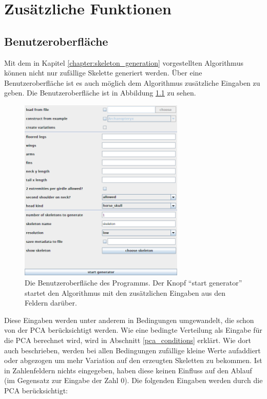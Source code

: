 \chapter{Zusätzliche Funktionen}
\label{chapter:additional_features}


\section{Benutzeroberfläche}
\label{gui}

Mit dem in Kapitel \ref{chapter:skeleton_generation} vorgestellten Algorithmus können nicht nur zufällige Skelette generiert werden. Über eine Benutzeroberfläche ist es auch möglich dem Algorithmus zusätzliche Eingaben zu geben. Die Benutzeroberfläche ist in Abbildung \ref{gui_screenshot} zu sehen.

\begin{figure}
 \centering
 \includegraphics[width=0.7\textwidth]{graphics/gui.png}
 \caption{Die Benutzeroberfläche des Programms. Der Knopf "`start generator"' startet den Algorithmus mit den zusätzlichen Eingaben aus den Feldern darüber.}
 \label{gui_screenshot}
\end{figure}

Diese Eingaben werden unter anderem in Bedingungen umgewandelt, die schon von der PCA berücksichtigt werden. Wie eine bedingte Verteilung als Eingabe für die PCA berechnet wird, wird in Abschnitt \ref{pca_conditions} erklärt. Wie dort auch beschrieben, werden bei allen Bedingungen zufällige kleine Werte aufaddiert oder abgezogen um mehr Variation auf den erzeugten Skeletten zu bekommen.
Ist in Zahlenfeldern nichts eingegeben, haben diese keinen Einfluss auf den Ablauf (im Gegensatz zur Eingabe der Zahl $0$). Die folgenden Eingaben werden durch die PCA berücksichtigt:

